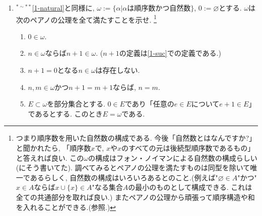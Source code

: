 \documentclass[dvipdfmx,a4paper,11pt]{article}
\theoremstyle{definition}
\begin{document}
\begin{enumerate}[label=\textbf{問}\ref*{sec-1}.\arabic*]
\item $^{* \sim **}$\ref{1-natural}と同様に, $\omega:= \{ \alpha | \text{$\alpha$は順序数かつ自然数}\}$, $0:=\varnothing$とする. 
$\omega$は次のペアノの公理を全て満たすことを示せ. \footnote{つまり順序数を用いた自然数の構成である. 今後「自然数とはなんですか?」と聞かれたら, 「順序数$x$で, $x$や$x$のすべての元は後続型順序数であるもの」と答えれば良い. この$\omega$の構成はフォン・ノイマンによる自然数の構成らしい(\cite{tana}にそう書いてた). 調べてみるとペアノの公理を満たすものは同型を除いて唯一であるらしく, 自然数の構成はいろいろあるとのこと.(例えば"$\varnothing \in A$"かつ"$x \in A$ならば$x \cup \{ x\} \in A$"なる集合$A$の最小のものとして構成できる. これは全ての共通部分を取れば良い.) またペアノの公理から頑張って順序構造や和を入れることができる.(\cite{obata}参照.)}
   \begin{enumerate}[label=(\arabic*).]
 \setlength{\parskip}{0cm}
  \setlength{\itemsep}{0pt}
  \item $0 \in \omega$.
  \item $n \in \omega$ならば$n+1 \in \omega$. ($n+1$の定義は\ref{1-suc}での定義である.)
  \item $n+1 = 0$となる$n \in \omega$は存在しない.
  \item  $n, m\in \omega$かつ$n+1 = m+1$ならば, $n=m$.
  \item $E \subset \omega$を部分集合とする. $0 \in E$であり「任意の$e \in E$について$e+1 \in E$」であるとする. このとき$E = \omega$である. 
  \end{enumerate}
   \end{enumerate}
\end{document}
